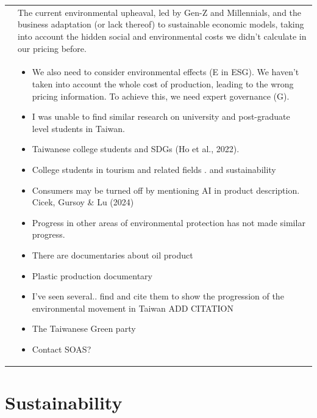 \documentclass[
  letterpaper,
  DIV=11,
  numbers=noendperiod]{scrartcl}
\begin{document}
\begin{longtable}[]{@{}
  >{\raggedright\arraybackslash}p{}
  >{\raggedright\arraybackslash}p{}@{}}
\toprule\noalign{}
\endhead
\bottomrule\noalign{}
\endlastfoot
& The current environmental upheaval, led by Gen-Z and Millennials, and
the business adaptation (or lack thereof) to sustainable economic
models, taking into account the hidden social and environmental costs we
didn't calculate in our pricing before. \\
& \begin{minipage}[t]{\linewidth}\raggedright
\begin{itemize}
\item
  We also need to consider environmental effects (E in ESG). We haven't
  taken into account the whole cost of production, leading to the wrong
  pricing information. To achieve this, we need expert governance (G).
\item
  I was unable to find similar research on university and post-graduate
  level students in Taiwan.
\item
  Taiwanese college students and SDGs (Ho et al., 2022).
\item
  College students in tourism and related fields . and sustainability
\item
  Consumers may be turned off by mentioning AI in product description.
  Cicek, Gursoy \& Lu (2024)
\item
  Progress in other areas of environmental protection has not made
  similar progress.
\item
  There are documentaries about oil product
\item
  Plastic production documentary
\item
  I've seen several.. find and cite them to show the progression of the
  environmental movement in Taiwan ADD CITATION
\item
  The Taiwanese Green party
\item
  Contact SOAS?
\end{itemize}
\end{minipage} \\
\end{longtable}

\newpage

\section{Sustainability}\label{sustainability}
\end{document}
